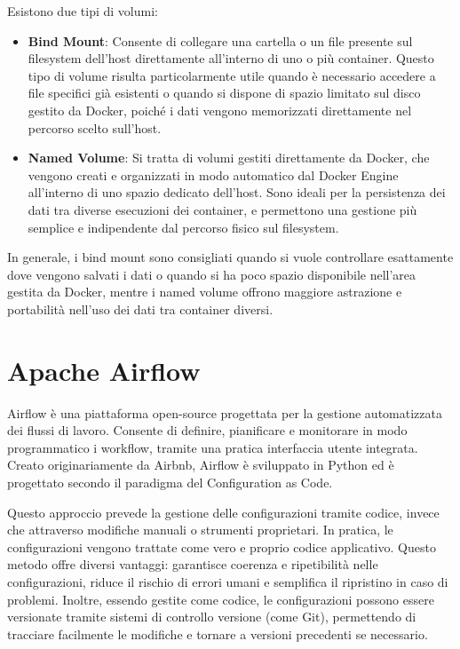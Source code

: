 Esistono due tipi di volumi:
\begin{itemize}
    \item \textbf{Bind Mount}: Consente di collegare una cartella o un file presente sul filesystem dell’host direttamente all’interno di uno o più container. Questo tipo di volume risulta particolarmente utile quando è necessario accedere a file specifici già esistenti o quando si dispone di spazio limitato sul disco gestito da Docker, poiché i dati vengono memorizzati direttamente nel percorso scelto sull’host.
    \item \textbf{Named Volume}: Si tratta di volumi gestiti direttamente da Docker, che vengono creati e organizzati in modo automatico dal Docker Engine all’interno di uno spazio dedicato dell’host. Sono ideali per la persistenza dei dati tra diverse esecuzioni dei container, e permettono una gestione più semplice e indipendente dal percorso fisico sul filesystem.
\end{itemize}

In generale, i bind mount sono consigliati quando si vuole controllare esattamente dove vengono salvati i dati o quando si ha poco spazio disponibile nell’area gestita da Docker, mentre i named volume offrono maggiore astrazione e portabilità nell’uso dei dati tra container diversi.




\section{Apache Airflow}
\label{sec:airflow}
Airflow è una piattaforma open-source progettata per la gestione automatizzata dei flussi di lavoro. Consente di definire, pianificare e monitorare in modo programmatico i workflow, tramite una pratica interfaccia utente integrata.
Creato originariamente da Airbnb, Airflow è sviluppato in Python ed è progettato secondo il paradigma del Configuration as Code. 

Questo approccio prevede la gestione delle configurazioni tramite codice, invece che attraverso modifiche manuali o strumenti proprietari. In pratica, le configurazioni vengono trattate come vero e proprio codice applicativo. Questo metodo offre diversi vantaggi: garantisce coerenza e ripetibilità nelle configurazioni, riduce il rischio di errori umani e semplifica il ripristino in caso di problemi. Inoltre, essendo gestite come codice, le configurazioni possono essere versionate tramite sistemi di controllo versione (come Git), permettendo di tracciare facilmente le modifiche e tornare a versioni precedenti se necessario.

